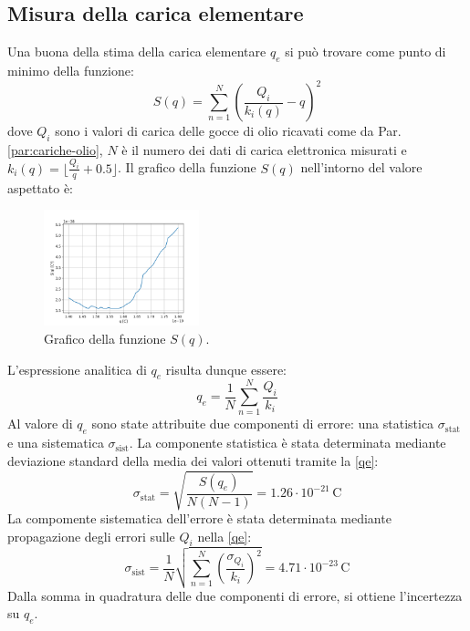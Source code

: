 \documentclass[]{article}
\let\oldsubsection\subsection%
\renewcommand{\subsection}{%
	\renewcommand{\theequation}{\thesubsection.\arabic{equation}}%
	\oldsubsection}%
\begin{document}
    \subsection{Misura della carica elementare}
    Una buona della stima della carica elementare $q_e$ si può trovare come punto di minimo della funzione:
    \begin{equation}
        \label{S-function}
        S(q) = \sum_{n=1}^{N} \left( \frac{Q_i}{k_i \left(q \right)} - q \right)^2
    \end{equation}
    dove $Q_i$ sono i valori di carica delle gocce di olio ricavati come da Par. \ref{par:cariche-olio}, $N$ è il numero dei dati di carica elettronica misurati e $k_i(q)=\lfloor\frac{Q_i}{q} + 0.5 \rfloor$.
    Il grafico della funzione $S(q)$ nell'intorno del valore aspettato è:
    \begin{figure}[H]
        \centering
        \includegraphics[width=0.40\textwidth]{analysis/graph.png}
        \caption{Grafico della funzione $S(q)$.}
        \label{graph}
    \end{figure}    
    L'espressione analitica di $q_e$ risulta dunque essere:
    \begin{equation}
        \label{qe}
        q_e = \frac{1}{N} \sum_{n=1}^{N} \frac{Q_i}{k_i}
    \end{equation}
    Al valore di $q_e$ sono state attribuite due componenti di errore: una statistica $\sigma_{\text{stat}}$ e una sistematica $\sigma_{\text{sist}}$. La componente statistica è stata determinata mediante deviazione standard della media dei valori ottenuti tramite la \ref{qe}:
    \begin{equation}
        \label{sigma-stat}
        \sigma_{\text{stat}} = \sqrt{ \frac{S(q_e)}{N \left(N-1 \right)} } = 1.26 \cdot 10^{-21} \, \text{C}
    \end{equation}
    La compomente sistematica dell'errore è stata determinata mediante propagazione degli errori sulle $Q_i$ nella \ref{qe}:
    \begin{equation}
        \sigma_{\text{sist}} = \frac{1}{N} \sqrt{\sum_{n=1}^{N} \left(\frac{\sigma_{Q_i}}{k_i} \right)^2} = 4.71 \cdot 10^{-23} \, \text{C}
    \end{equation}
    Dalla somma in quadratura delle due componenti di errore, si ottiene l'incertezza su $q_e$.
\end{document}
